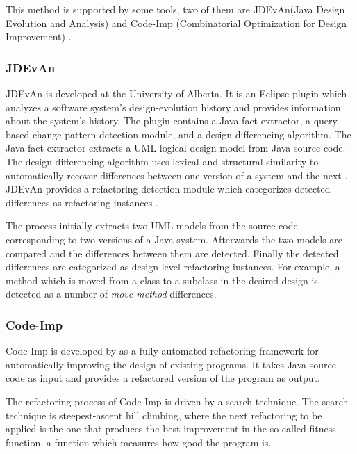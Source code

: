 \documentclass[conference,compsoc,a4paper]{IEEEtran}
\newcommand{\JDEvAn}{\mbox{JDEvAn}\xspace}
\begin{document}
This method is supported by some tools, two of them are \JDEvAn (Java Design Evolution and Analysis) \cite{JDEvAn} and 
Code-Imp (Combinatorial Optimization for Design Improvement) \cite{DBLP:journals/jss/OKeeffeC08, 
DBLP:conf/icse/MoghadamC11}.

\subsubsection{JDEvAn}

\JDEvAn is developed at the University of Alberta. It is an Eclipse plugin which analyzes a software system's 
design-evolution history and provides information about the system's history. The plugin contains a Java fact 
extractor, a query-based change-pattern detection module, and a design differencing algorithm. The Java fact extractor 
extracts a UML logical design model from Java source code. The design differencing algorithm uses lexical and 
structural similarity to automatically recover differences between one version of a system and the next \cite{Xing2007}.
\JDEvAn provides a refactoring-detection module which categorizes detected differences as refactoring instances 
\cite{DBLP:conf/wcre/XingS06}.

The process initially extracts two UML models from the source code corresponding to two versions of a Java system. 
Afterwards the two models are compared and the differences between them are detected. Finally the detected differences 
are categorized as design-level refactoring instances. For example, a method which is moved from a class to a subclass 
in the desired design is detected as a number of \emph{move method} differences.

\subsubsection{Code-Imp}

Code-Imp is developed by \cite{DBLP:journals/jss/OKeeffeC08, DBLP:conf/icse/MoghadamC11} as a fully automated 
refactoring framework for automatically improving the design of existing programs. It takes Java source code as input 
and provides a refactored version of the program as output.

The refactoring process of Code-Imp is driven by a search technique. The search technique is steepest-ascent 
hill climbing, where the next refactoring to be applied is the one that produces the best improvement in the so called 
fitness function, a function which measures how good the program is.
\end{document}
